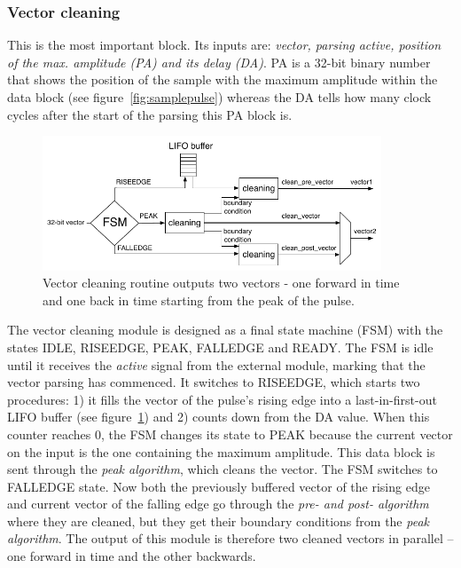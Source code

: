  
\subsubsection{Vector cleaning}
This is the most important block. Its inputs are: \emph{vector, parsing active, position of the max. amplitude (PA) and its delay (DA)}. PA is a 32-bit binary number that shows the position of the sample with the maximum amplitude within the data block (see figure~\ref{fig:samplepulse}) whereas the DA tells how many clock cycles after the start of the parsing this PA block is.
\begin{figure}[!t]
\centering
\includegraphics[width=0.9\textwidth]{05_current_monitoring/plots/vector_clean}
\caption{Vector cleaning routine outputs two vectors - one forward in time and one back in time starting from the peak of the pulse.}
\label{fig:routine}
\end{figure}
The vector cleaning module is designed as a final state machine (FSM) with the states IDLE, RISEEDGE, PEAK, FALLEDGE and READY.  The FSM is idle until it receives the \emph{active} signal from the external module, marking that the vector parsing has commenced. It switches to RISEEDGE, which starts two procedures: 1) it fills the vector of the pulse's rising edge into a last-in-first-out LIFO buffer (see figure~\ref{fig:routine}) and 2) counts down from the DA value. When this counter reaches 0, the FSM changes its state to PEAK because the current vector on the input is the one containing the maximum amplitude. This data block is sent through the \emph{peak algorithm}, which cleans the vector. The FSM switches to FALLEDGE state. Now both the previously buffered vector of the rising edge and current vector of the falling edge go through the \emph{pre- and post- algorithm} where they are cleaned, but they get their boundary conditions from the \emph{peak algorithm}. The output of this module is therefore two cleaned vectors in parallel -- one forward in time and the other backwards.



